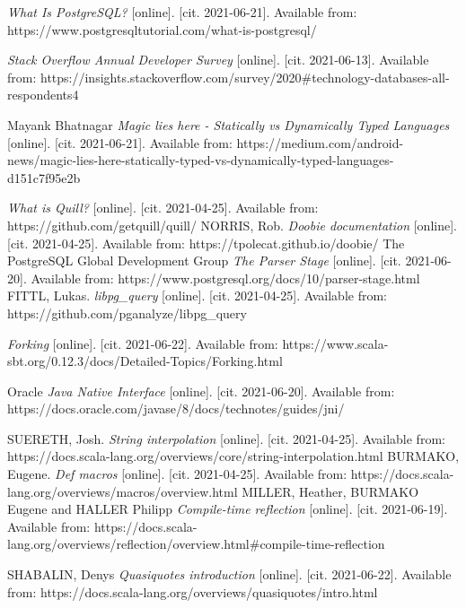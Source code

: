 \documentclass[thesis=B,english]{FITthesis}[2019/12/23]
\begin{document}


\begin{thebibliography}{9}

\textit {What Is PostgreSQL?} [online]. [cit. 2021-06-21]. Available from:
https://www.postgresqltutorial.com/what-is-postgresql/

\textit {Stack Overflow Annual Developer Survey} [online]. [cit. 2021-06-13]. Available from: https://insights.stackoverflow.com/survey/2020\#technology-databases-all-respondents4

Mayank Bhatnagar
\textit {Magic lies here - Statically vs Dynamically Typed Languages} [online]. [cit. 2021-06-21]. Available from: https://medium.com/android-news/magic-lies-here-statically-typed-vs-dynamically-typed-languages-d151c7f95e2b

\textit {What is Quill?} [online]. [cit. 2021-04-25]. Available from: https://github.com/getquill/quill/
NORRIS, Rob. 
\textit {Doobie documentation} [online]. [cit. 2021-04-25]. Available from: https://tpolecat.github.io/doobie/
The PostgreSQL Global Development Group
\textit{The Parser Stage} [online]. [cit. 2021-06-20]. Available from: https://www.postgresql.org/docs/10/parser-stage.html
FITTL, Lukas.
\textit {libpg\_query} [online]. [cit. 2021-04-25]. Available from:
https://github.com/pganalyze/libpg\_query

\textit {Forking} [online]. [cit. 2021-06-22]. Available from:
https://www.scala-sbt.org/0.12.3/docs/Detailed-Topics/Forking.html

Oracle
\textit{Java Native Interface} [online]. [cit. 2021-06-20]. Available from:
https://docs.oracle.com/javase/8/docs/technotes/guides/jni/

SUERETH, Josh. 
\textit {String interpolation} [online]. [cit. 2021-04-25]. Available from: https://docs.scala-lang.org/overviews/core/string-interpolation.html
BURMAKO, Eugene. 
\textit {Def macros} [online]. [cit. 2021-04-25]. Available from: https://docs.scala-lang.org/overviews/macros/overview.html
MILLER, Heather, BURMAKO Eugene and HALLER Philipp 
\textit {Compile-time reflection} [online]. [cit. 2021-06-19]. Available from: https://docs.scala-lang.org/overviews/reflection/overview.html\#compile-time-reflection

SHABALIN, Denys
\textit {Quasiquotes introduction} [online]. [cit. 2021-06-22]. Available from:
https://docs.scala-lang.org/overviews/quasiquotes/intro.html


\end{thebibliography}
\appendix
\end{document}
